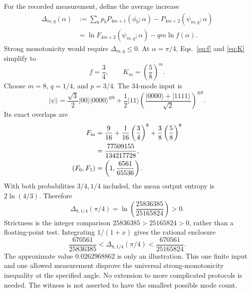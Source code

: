 \documentclass[aps,pra,reprint,amsmath,amssymb,longbibliography,floatfix]{revtex4-2}
\newcommand{\ket}[1]{\lvert #1\rangle}
\newcommand{\vac}{\ket{0000}}
\newcommand{\Ptw}{P}
\newcommand{\Ftw}{F}
\begin{document}
For the recorded measurement, define the average increase
\begin{align}
 \Delta_{m,q}(\alpha)
  &:=\sum_b p_b\Ptw_{4m+1}(\phi_b;\alpha)
           -\Ptw_{4m+2}(\psi_{m,q};\alpha)\nonumber\\
  &=\ln \Ftw_{4m+2}(\psi_{m,q};\alpha)
                -q m\ln f(\alpha).
 \label{eq:delta}
\end{align}
Strong monotonicity would require \(\Delta_{m,q}\leq0\).
At \(\alpha=\pi/4\), Eqs.~\eqref{eq:f} and \eqref{eq:K} simplify to
\begin{equation}
 f=\frac34,\qquad K_m=\left(\frac58\right)^m.
 \label{eq:midpoint}
\end{equation}
Choose \(m=8\), \(q=1/4\), and \(p=3/4\). The 34-mode input is
\begin{equation}
 \ket{\psi}=\frac{\sqrt3}{2}\ket{00}\vac^{\otimes8}
       +\frac12\ket{11}
          \left(\frac{\ket{0000}+\ket{1111}}{\sqrt2}\right)^{\otimes8}.
 \label{eq:witness}
\end{equation}
Its exact overlaps are
\begin{align}
 \Ftw_{\rm in}
   &=\frac9{16}+\frac1{16}\left(\frac34\right)^8
                      +\frac38\left(\frac58\right)^8\nonumber\\
   &=\frac{77509155}{134217728},\label{eq:Fin}\\
 (\Ftw_0,\Ftw_1)&=\left(1,\frac{6561}{65536}\right).
 \label{eq:Fout}
\end{align}
With both probabilities \(3/4,1/4\) included, the mean output
entropy is \(2\ln(4/3)\). Therefore
\begin{equation}
 \Delta_{8,1/4}(\pi/4)
       =\ln\!\left(\frac{25836385}{25165824}\right)>0.
 \label{eq:certificate}
\end{equation}
Strictness is the integer comparison
\(25836385>25165824>0\), rather than a floating-point test.
Integrating \(1/(1+x)\) gives the rational enclosure
\begin{equation}
 \frac{670561}{25836385}
 <\Delta_{8,1/4}(\pi/4)
 <\frac{670561}{25165824}.
 \label{eq:logbounds}
\end{equation}
The approximate value \(0.0262968862\) is only an illustration.
This one finite input and one allowed measurement disprove
the universal strong-monotonicity inequality at the specified angle.
No extension to more complicated protocols is needed.
The witness is not asserted to have the smallest possible mode count.
\end{document}
